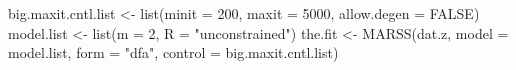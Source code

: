 \begin{Schunk}
\begin{Sinput}
 big.maxit.cntl.list <- list(minit = 200, maxit = 5000, allow.degen = FALSE)
 model.list <- list(m = 2, R = "unconstrained")
 the.fit <- MARSS(dat.z, model = model.list, form = "dfa", 
                  control = big.maxit.cntl.list)
\end{Sinput}
\end{Schunk}

